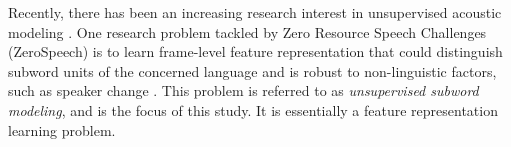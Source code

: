 \documentclass[a4paper]{article}
\begin{document}
Recently, there has been an increasing  research interest in unsupervised acoustic modeling \cite{chen2015parallel,heck2017feature,Kamper2017segmental,Tjandra2019,Feng2019combining,Ondel2019Bayesian}. 
One  research problem tackled by Zero Resource Speech Challenges (ZeroSpeech) \cite{versteegh2015zero,dunbar2017zero,Dunbar2019} is to learn frame-level feature representation that could distinguish subword units of the concerned language and is robust to non-linguistic factors, such as speaker change \cite{versteegh2015zero,dunbar2017zero}. This problem is   referred to as \textit{unsupervised subword modeling}, and is the focus of this study. It is essentially a feature representation learning problem.

\end{document}
